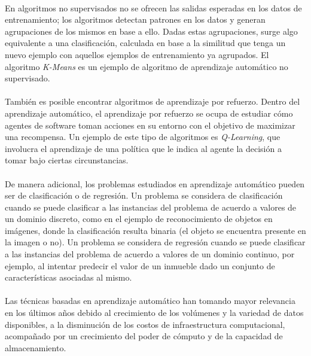 \newpage %

\paragraph{} En algoritmos no supervisados no se ofrecen las salidas esperadas en los datos de entrenamiento; los algoritmos detectan patrones en los datos y generan agrupaciones de los mismos en base a ello.
Dadas estas agrupaciones, surge algo equivalente a una clasificación, calculada en base a la similitud que tenga un nuevo ejemplo con aquellos ejemplos de entrenamiento ya agrupados.
El algoritmo \textit{K-Means} es un ejemplo de algoritmo de aprendizaje automático no supervisado. 

\paragraph{}También es posible encontrar algoritmos de aprendizaje por refuerzo.
Dentro del aprendizaje automático, el aprendizaje por refuerzo se ocupa de estudiar cómo agentes de software toman acciones en su entorno con el objetivo de maximizar una recompensa.
Un ejemplo de este tipo de algoritmos es \textit{Q-Learning}, que involucra el aprendizaje de una política que le indica al agente la decisión a tomar bajo ciertas circunstancias.

\paragraph{}De manera adicional, los problemas estudiados en aprendizaje automático pueden ser de clasificación o de regresión.
Un problema se considera de clasificación cuando se puede clasificar a las instancias del problema de acuerdo a valores de un dominio discreto, como en el ejemplo de reconocimiento de objetos en imágenes, donde la clasificación resulta binaria (el objeto se encuentra presente en la imagen o no).
Un problema se considera de regresión cuando se puede clasificar a las instancias del problema de acuerdo a valores de un dominio continuo, por ejemplo, al intentar predecir el valor de un inmueble dado un conjunto de características asociadas al mismo.

\paragraph{}Las técnicas basadas en aprendizaje automático han tomando mayor relevancia en los últimos años debido al crecimiento de los volúmenes y la variedad de datos disponibles, a la disminución de los costos de infraestructura computacional, acompañado por un crecimiento del poder de cómputo y de la capacidad de almacenamiento.

